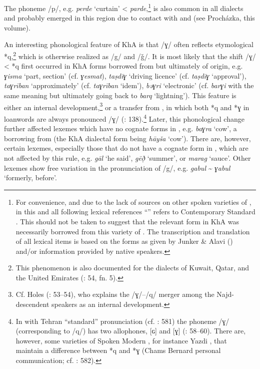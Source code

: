 \documentclass[output=paper,nonflat]{langsci/langscibook}
\begin{document}
The {phoneme} /p/, e.g. \textit{perde} ‘curtain’ <  \textit{parde},\footnote{For convenience, and due to the lack of sources on other spoken varieties of , in this and all following lexical references ``'' refers to Contemporary {Standard} . This should not be taken to suggest that the relevant form in KhA was necessarily borrowed from this variety of . The transcription and translation of all  lexical items is based on the forms as given by Junker \& Alavi (\citeyear{JunkerAlavi2002}) and/or information provided by native speakers.} is also common in all  dialects and probably emerged in this region due to contact with  and  (see Procházka, this volume). 

An interesting phonological feature of KhA is that /ɣ/ often reflects etymological *q,\footnote{This phenomenon is also documented for the  dialects of Kuwait, Qatar, and the United  Emirates (\citealt{Holes2016}: 54, fn. 5).} which is otherwise realized as /g/ and /ǧ/. It is most likely that the shift /ɣ/ < *q first occurred in KhA forms borrowed from  but ultimately of  origin, e.g. \textit{ɣisma} ‘part, section’ (cf.  \textit{ɣesmat}), \textit{taṣdīɣ} ‘driving licence’ (cf.  \textit{taṣdīɣ} `approval'), \textit{taɣrīban} ‘approximately’ (cf.  \textit{taɣrīban} `idem'), \textit{bəɣri} ‘electronic’ (cf.  \textit{barɣi} with the same meaning but ultimately going back to  \textit{barq} ‘lightning’). This feature is either an internal development,\footnote{Cf. Holes (\citeyear{Holes2016}: 53–54), who explains the /ɣ/–/q/ {merger} among the Najd-descendent   speakers as an internal development.} or a {transfer} from , in which both *q and *ɣ in  {loanwords} are always pronounced /ɣ/ (\citealt{MatrasShabibi2007}: 138).\footnote{In   with Tehran ``standard'' pronunciation (cf. \citealt{Paul2018}: 581) the {phoneme} /ɣ/ (corresponding to  /q/) has two allophones, [ɢ] and [ɣ] (\citealt{Majidi1986}: 58–60). There are, however, some varieties of Spoken Modern , for instance Yazdi , that maintain a difference between *q and *ɣ (Chams Bernard  personal communication; cf. \citealt{Paul2018}: 582).} Later, this phonological change further affected lexemes which have no {cognate} forms in , e.g. \textit{baɣra} `cow', a borrowing from   (the KhA dialectal form being \textit{hāyša} `cow'). There are, however, certain lexemes, especially those that do not have a {cognate} form in , which are not affected by this rule, e.g. \textit{gāl} `he said', \textit{gēð̣} ‘summer’, or \textit{marag} ‘sauce’. Other lexemes show free variation in the pronunciation of /g/, e.g. \textit{gabul} \~{} \textit{ɣabul} `formerly, before'.
\end{document}
